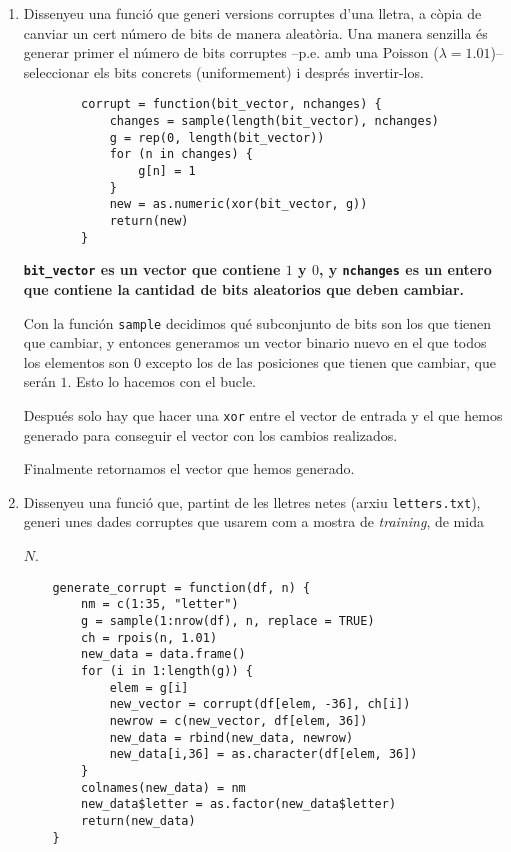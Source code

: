 \documentclass[a4paper]{article}
\begin{document}
    \begin{enumerate}
        \item Dissenyeu una funció que generi versions corruptes d'una lletra, a còpia de canviar un cert número
        de bits de manera aleatòria. Una manera senzilla és generar primer el número de bits corruptes --p.e.
        amb una Poisson ($\lambda = 1.01$)--
        seleccionar els bits concrets (uniformement) i després invertir-los.

        \begin{lstlisting}
        corrupt = function(bit_vector, nchanges) {
            changes = sample(length(bit_vector), nchanges)
            g = rep(0, length(bit_vector))
            for (n in changes) {
                g[n] = 1
            }
            new = as.numeric(xor(bit_vector, g))
            return(new)
        }
        \end{lstlisting}

        {\bfseries
        \texttt{bit\_vector} es un vector que contiene $1$ y $0$, y \texttt{nchanges} es un entero que contiene la cantidad de bits aleatorios que deben cambiar.

        Con la función \texttt{sample} decidimos qué subconjunto de bits son los que tienen que cambiar, y entonces generamos un vector binario nuevo en el que todos los elementos son $0$ excepto los de las posiciones que tienen que cambiar, que serán $1$. Esto lo hacemos con el bucle.

        Después solo hay que hacer una \texttt{xor} entre el vector de entrada y el que hemos generado para conseguir el vector con los cambios realizados.

        Finalmente retornamos el vector que hemos generado.
        }

        \item Dissenyeu una funció que, partint de les lletres netes (arxiu \texttt{letters.txt}),
        generi unes dades
        corruptes que usarem com a mostra de \textit{training}, de mida


        $N$.

        \begin{lstlisting}
    generate_corrupt = function(df, n) {
        nm = c(1:35, "letter")
        g = sample(1:nrow(df), n, replace = TRUE)
        ch = rpois(n, 1.01)
        new_data = data.frame()
        for (i in 1:length(g)) {
            elem = g[i]
            new_vector = corrupt(df[elem, -36], ch[i])
            newrow = c(new_vector, df[elem, 36])
            new_data = rbind(new_data, newrow)
            new_data[i,36] = as.character(df[elem, 36])
        }
        colnames(new_data) = nm
        new_data$letter = as.factor(new_data$letter)
        return(new_data)
    }
        \end{lstlisting}


\end{enumerate}
\end{document}
